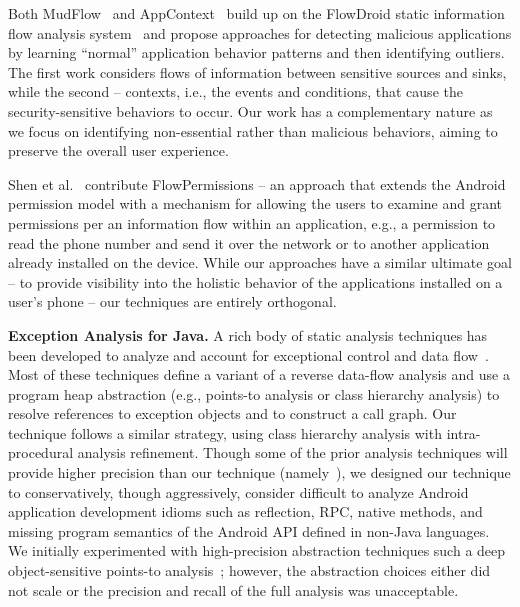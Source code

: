 Both MudFlow~\cite{Avdiienko:Kuznetsov:Gorla:Zeller:Arzt:Rasthofer:Bodden:ICSE15} and AppContext~\cite{Yang:Xiao:Andow:Li:Xie:Enck:ICSE15} build up on the FlowDroid static information flow analysis system~\cite{Arzt:Rasthofer:Fritz:Bodden:Bartel:Klein:Traon:Octeau:McDaniel:PLDI14} and propose approaches 
for detecting malicious applications by learning ``normal'' application behavior patterns and then identifying outliers. 
The first work considers flows of information between sensitive sources and sinks, while the second  -- contexts, i.e., the events and conditions, that cause the security-sensitive behaviors to occur. 
Our work has a complementary nature as we focus on identifying non-essential rather than malicious behaviors, aiming to preserve the overall user experience. 

Shen et al.~\cite{Shen:Vishnubhotla:Todarka:Arora:Dhandapani:Lehner:Ko:Ziarek:ASE14} contribute FlowPermissions -- 
an approach that extends the Android permission model with a mechanism for allowing the users to examine and grant permissions per an information flow within an application, e.g., a permission to read
the phone number and send it over the network or to another application already installed on the device. 
While our approaches have a similar ultimate goal -- to provide visibility into the holistic behavior of the applications installed on a user's phone -- our techniques are entirely orthogonal. 


\vspace{0.1in}
\noindent 
{\bf Exception Analysis for Java.}  A rich body of static analysis
techniques has been developed to analyze and account for exceptional
control and data
flow~\cite{Byeong-MoChang2002,Chang2001,Fu2005,Fu2007,Jo2004,Qiu2010,Kastrinis2013}.
Most of these techniques define a variant of a reverse data-flow
analysis and use a program heap abstraction (e.g., points-to
analysis or class hierarchy analysis) to resolve references to
exception objects and to construct a call graph. Our technique follows
a similar strategy, using class hierarchy analysis with
intra-procedural analysis refinement.  Though some of the prior
analysis techniques will provide higher precision than our technique
(namely~\cite{Fu2005,Fu2007,Qiu2010}), we designed our technique to
conservatively, though aggressively, consider difficult to analyze
Android application development idioms such as reflection, RPC, native
methods, and missing program semantics of the Android API defined in
non-Java languages.  We initially experimented with high-precision
abstraction techniques such a deep object-sensitive points-to
analysis~\cite{Smaragdakis2011}; however, the abstraction choices
either did not scale or the precision and recall of the full analysis
was unacceptable.
